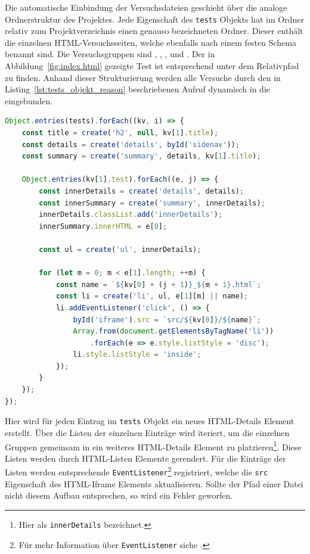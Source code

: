 Die automatische Einbindung der Versuchsdateien geschieht über die analoge Ordnerstruktur des Projektes.
Jede Eigenschaft des \lstinline{tests} Objekts hat im  Ordner relativ zum Projektverzeichnis einen genauso bezeichneten Ordner.
Dieser enthält die einzelnen HTML-Versuchsseiten, welche ebenfalls nach einem festen Schema benannt sind.
Die Versuchsgruppen sind , , ,  und .
Der in Abbildung~\ref{fig:index.html} gezeigte Test ist entsprechend unter dem Relativpfad  zu finden.
Anhand dieser Strukturierung werden alle Versuche durch den in Listing~\ref{lst:tests_objekt_reason} beschriebenen Aufruf dynamisch in die  eingebunden.

\begin{lstlisting}[language=JavaScript, caption={Iteration über das tests Objekt zur Befüllung der Navigationsleiste.}, label={lst:tests_objekt_reason}]
Object.entries(tests).forEach((kv, i) => {
    const title = create('h2', null, kv[1].title);
    const details = create('details', byId('sidenav'));
    const summary = create('summary', details, kv[1].title);

    Object.entries(kv[1].test).forEach((e, j) => {
        const innerDetails = create('details', details);
        const innerSummary = create('summary', innerDetails);
        innerDetails.classList.add('innerDetails');
        innerSummary.innerHTML = e[0];

        const ul = create('ul', innerDetails);

        for (let m = 0; m < e[1].length; ++m) {
            const name = `${kv[0] + (j + 1)}_${m + 1}.html`;
            const li = create('li', ul, e[1][m] || name);
            li.addEventListener('click', () => {
                byId('iframe').src = `src/${kv[0]}/${name}`;
                Array.from(document.getElementsByTagName('li'))
                    .forEach(e => e.style.listStyle = 'disc');
                li.style.listStyle = 'inside';
            });
        }
    });
});
\end{lstlisting}

Hier wird für jeden Eintrag im \lstinline{tests} Objekt ein neues HTML-Details Element erstellt.
Über die Listen der einzelnen Einträge wird iteriert, um die einzelnen Gruppen gemeinsam in ein weiteres HTML-Details Element zu platzieren\footnote{Hier als \lstinline{innerDetails} bezeichnet.}.
Diese Listen werden durch HTML-Listen Elemente gerendert.
Für die Einträge der Listen werden entsprechende \lstinline{EventListener}\footnote{Für mehr Information über \lstinline{EventListener} siehe .} registriert, welche die \lstinline{src} Eigenschaft des HTML-Iframe Elements aktualisieren.
Sollte der Pfad einer Datei nicht diesem Aufbau entsprechen, so wird ein Fehler geworfen.

